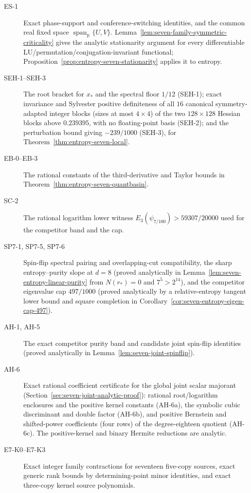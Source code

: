 \begin{description}
\item[ES-1] Exact phase-support and conference-switching identities, and the common real fixed space
$\operatorname{span}_{\mathbb R}\{U,V\}$. Lemma~\ref{lem:seven-family-symmetric-criticality} gives the analytic
stationarity argument for every differentiable LU/permutation/conjugation-invariant functional;
Proposition~\ref{prop:entropy-seven-stationarity} applies it to entropy.
\item[SEH-1--SEH-3] The root bracket for $x_*$ and the spectral floor $1/12$ (SEH-1); exact invariance and
Sylvester positive definiteness of all $16$ canonical symmetry-adapted integer blocks (sizes at most $4\times4$)
of the two $128\times128$ Hessian blocks above $0.239395$, with no floating-point basis (SEH-2); and the
perturbation bound giving $-239/1000$ (SEH-3), for
Theorem~\ref{thm:entropy-seven-local}.
\item[EB-0--EB-3] The rational constants of the third-derivative and Taylor bounds in
Theorem~\ref{thm:entropy-seven-quantbasin}.
\item[SC-2] The rational logarithm lower witness $E_3(\psi_{7/100})>59307/20000$ used for the competitor band and the cap.
\item[SP7-1, SP7-5, SP7-6] Spin-flip spectral pairing and overlapping-cut compatibility,
the sharp entropy--purity slope at $d=8$ (proved analytically in Lemma~\ref{lem:seven-entropy-linear-purity} from $N(r_*)=0$ and $7^5>2^{14}$), and the competitor eigenvalue cap $497/1000$ (proved analytically by a relative-entropy tangent lower bound and square completion in Corollary~\ref{cor:seven-entropy-eigen-cap-497}).
\item[AH-1, AH-5] The exact competitor purity band and candidate joint spin-flip identities (proved analytically in Lemma~\ref{lem:seven-joint-spinflip}).
\item[AH-6] Exact rational coefficient certificate for the global joint scalar majorant
(Section~\ref{sec:seven-joint-analytic-proof}): rational root/logarithm enclosures and the positive kernel constants (AH-6a),
the symbolic cubic discriminant and double factor (AH-6b), and positive Bernstein and shifted-power coefficients (four rows) of the
degree-eighteen quotient (AH-6c). The positive-kernel and binary Hermite reductions are analytic.
\item[E7-K0--E7-K3] Exact integer family contractions for seventeen five-copy sources, exact generic
rank bounds by determining-point minor identities, and exact three-copy kernel source polynomials.

\end{description}
